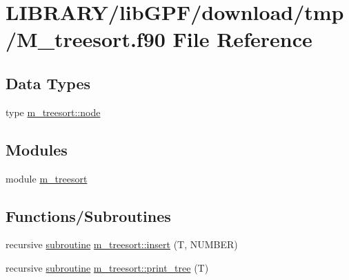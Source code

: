 \hypertarget{M__treesort_8f90}{}\section{L\+I\+B\+R\+A\+R\+Y/lib\+G\+P\+F/download/tmp/\+M\+\_\+treesort.f90 File Reference}
\label{M__treesort_8f90}
\subsection*{Data Types}
\begin{DoxyCompactItemize}
\item 
type \hyperlink{structm__treesort_1_1node}{m\+\_\+treesort\+::node}
\end{DoxyCompactItemize}
\subsection*{Modules}
\begin{DoxyCompactItemize}
\item 
module \hyperlink{namespacem__treesort}{m\+\_\+treesort}
\end{DoxyCompactItemize}
\subsection*{Functions/\+Subroutines}
\begin{DoxyCompactItemize}
\item 
recursive \hyperlink{M__stopwatch_83_8txt_acfbcff50169d691ff02d4a123ed70482}{subroutine} \hyperlink{namespacem__treesort_a98f5c84e643f81e068aec72ac569c3d1}{m\+\_\+treesort\+::insert} (T, N\+U\+M\+B\+ER)
\item 
recursive \hyperlink{M__stopwatch_83_8txt_acfbcff50169d691ff02d4a123ed70482}{subroutine} \hyperlink{namespacem__treesort_adbff3cab09e78694a914782b533e2732}{m\+\_\+treesort\+::print\+\_\+tree} (T)
\end{DoxyCompactItemize}
